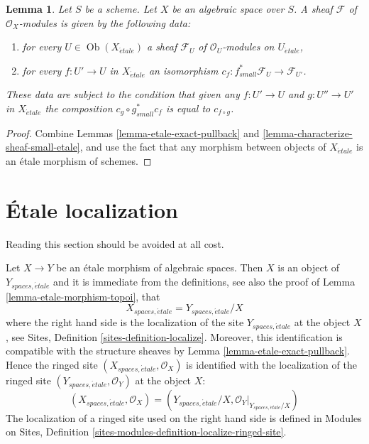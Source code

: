 \documentclass{stacks-project}
\theoremstyle{plain}
\newtheorem{lemma}[subsection]{Lemma}
\theoremstyle{definition}
\theoremstyle{remark}
\numberwithin{equation}{subsection}
\def\Ob{\mathop{\mathrm{Ob}}\nolimits}
\def\etale{{\acute{e}tale}}
\begin{document}
\begin{lemma}
\label{lemma-characterize-module-small-etale}
Let $S$ be a scheme. Let $X$ be an algebraic space over $S$.
A sheaf $\mathcal{F}$ of $\mathcal{O}_X$-modules is given by the following
data:
\begin{enumerate}
\item for every $U \in \Ob(X_\etale)$ a sheaf
$\mathcal{F}_U$ of $\mathcal{O}_U$-modules on $U_\etale$,
\item for every $f : U' \to U$ in $X_\etale$ an isomorphism
$c_f : f_{small}^*\mathcal{F}_U \to \mathcal{F}_{U'}$.
\end{enumerate}
These data are subject to the condition that given any $f : U' \to U$
and $g : U'' \to U'$ in $X_\etale$ the composition
$c_g \circ g_{small}^*c_f$ is equal to $c_{f \circ g}$.
\end{lemma}

\begin{proof}
Combine Lemmas \ref{lemma-etale-exact-pullback}
and \ref{lemma-characterize-sheaf-small-etale}, and use the fact that
any morphism between objects of $X_\etale$ is an \'etale morphism
of schemes.
\end{proof}







\section{\'Etale localization}
\label{section-localize}

\noindent
Reading this section should be avoided at all cost.

\medskip\noindent
Let $X \to Y$ be an \'etale morphism of algebraic spaces.
Then $X$ is an object of $Y_{spaces, \etale}$ and it is
immediate from the definitions, see also the proof of
Lemma \ref{lemma-etale-morphism-topoi},
that
\begin{equation}
\label{equation-localize}
X_{spaces, \etale} = Y_{spaces, \etale}/X
\end{equation}
where the right hand side is the localization of the site
$Y_{spaces, \etale}$ at the object $X$, see
Sites, Definition \ref{sites-definition-localize}.
Moreover, this identification is compatible with the structure sheaves by
Lemma \ref{lemma-etale-exact-pullback}.
Hence the ringed site $(X_{spaces, \etale}, \mathcal{O}_X)$
is identified with the localization of the ringed site
$(Y_{spaces, \etale}, \mathcal{O}_Y)$ at the object $X$:
\begin{equation}
\label{equation-localize-ringed}
(X_{spaces, \etale}, \mathcal{O}_X) =
(Y_{spaces, \etale}/X, \mathcal{O}_Y|_{Y_{spaces, \etale}/X})
\end{equation}
The localization of a ringed site used on the right hand side is defined in
Modules on Sites,
Definition \ref{sites-modules-definition-localize-ringed-site}.
\end{document}
